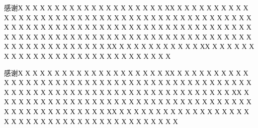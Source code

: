 
\begin{thank}
	感谢Х Х Х Х Х Х Х Х Х Х Х  Х Х Х Х Х Х Х Х Х ХХ Х Х Х Х Х  Х Х Х Х Х Х Х Х Х Х Х Х Х Х Х Х Х Х Х Х Х Х Х Х Х Х Х Х Х Х Х Х Х Х Х Х Х Х Х Х Х Х Х Х Х Х Х Х  Х Х Х Х Х Х Х Х Х Х Х Х Х Х Х Х  Х Х Х Х Х Х Х Х Х Х Х Х Х Х Х Х Х Х Х Х Х Х Х Х Х Х Х Х Х Х Х Х Х Х Х Х Х Х Х Х Х Х Х Х Х Х Х Х  Х Х Х Х Х Х Х Х Х ХХ Х Х Х Х Х  Х Х Х Х Х Х ХХ Х Х Х Х Х Х Х Х Х Х Х Х Х Х Х Х Х Х Х Х Х Х Х Х Х Х Х Х Х  \par
	感谢Х Х Х Х Х Х Х Х Х Х Х  Х Х Х Х Х Х Х Х Х ХХ Х Х Х Х Х  Х Х Х Х Х Х Х Х Х Х Х Х Х Х Х Х Х Х Х Х Х Х Х Х Х Х Х Х Х Х Х Х Х Х Х Х Х Х Х Х Х Х Х Х Х Х Х Х  Х Х Х Х Х Х Х Х Х Х Х Х Х Х Х Х  Х Х Х Х Х Х ХХ Х Х Х Х Х Х Х Х Х Х Х Х Х Х Х Х Х Х Х Х Х Х Х Х Х Х Х Х Х Х Х Х Х Х Х Х Х Х Х Х  Х Х Х Х Х Х Х Х Х ХХ Х Х Х Х Х Х Х Х Х Х Х Х Х Х Х Х Х Х Х Х Х Х Х Х Х Х Х Х Х Х Х Х Х Х Х Х Х Х Х Х Х Х  \par
	

\end{thank}
